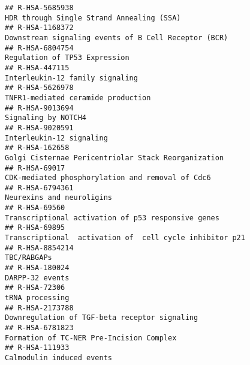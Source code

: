 \documentclass[
]{article}
\begin{document}
\begin{verbatim}
## R-HSA-5685938                                                                                            HDR through Single Strand Annealing (SSA)
## R-HSA-1168372                                                                                 Downstream signaling events of B Cell Receptor (BCR)
## R-HSA-6804754                                                                                                        Regulation of TP53 Expression
## R-HSA-447115                                                                                                       Interleukin-12 family signaling
## R-HSA-5626978                                                                                                   TNFR1-mediated ceramide production
## R-HSA-9013694                                                                                                                  Signaling by NOTCH4
## R-HSA-9020591                                                                                                             Interleukin-12 signaling
## R-HSA-162658                                                                                   Golgi Cisternae Pericentriolar Stack Reorganization
## R-HSA-69017                                                                                       CDK-mediated phosphorylation and removal of Cdc6
## R-HSA-6794361                                                                                                            Neurexins and neuroligins
## R-HSA-69560                                                                                   Transcriptional activation of p53 responsive genes  
## R-HSA-69895                                                                              Transcriptional  activation of  cell cycle inhibitor p21 
## R-HSA-8854214                                                                                                                          TBC/RABGAPs
## R-HSA-180024                                                                                                                       DARPP-32 events
## R-HSA-72306                                                                                                                        tRNA processing
## R-HSA-2173788                                                                                        Downregulation of TGF-beta receptor signaling
## R-HSA-6781823                                                                                             Formation of TC-NER Pre-Incision Complex
## R-HSA-111933                                                                                                             Calmodulin induced events

\end{verbatim}
\end{document}
